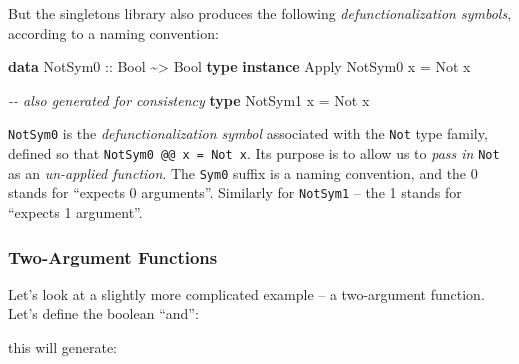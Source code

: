 \documentclass[]{article}
\newenvironment{Shaded}{}{}
\newcommand{\CommentTok}[1]{\textcolor[rgb]{0.38,0.63,0.69}{\textit{#1}}}
\newcommand{\DataTypeTok}[1]{\textcolor[rgb]{0.56,0.13,0.00}{#1}}
\newcommand{\KeywordTok}[1]{\textcolor[rgb]{0.00,0.44,0.13}{\textbf{#1}}}
\newcommand{\NormalTok}[1]{#1}
\newcommand{\OperatorTok}[1]{\textcolor[rgb]{0.40,0.40,0.40}{#1}}
\newcommand{\OtherTok}[1]{\textcolor[rgb]{0.00,0.44,0.13}{#1}}
\begin{document}
But the singletons library also produces the following \emph{defunctionalization
symbols}, according to a naming convention:

\begin{Shaded}
\begin{Highlighting}[]
\KeywordTok{data} \DataTypeTok{NotSym0}\OtherTok{ ::} \DataTypeTok{Bool} \OperatorTok{\textasciitilde{}\textgreater{}} \DataTypeTok{Bool}
\KeywordTok{type} \KeywordTok{instance} \DataTypeTok{Apply} \DataTypeTok{NotSym0}\NormalTok{ x }\OtherTok{=} \DataTypeTok{Not}\NormalTok{ x}

\CommentTok{{-}{-} also generated for consistency}
\KeywordTok{type} \DataTypeTok{NotSym1}\NormalTok{ x }\OtherTok{=} \DataTypeTok{Not}\NormalTok{ x}
\end{Highlighting}
\end{Shaded}

\texttt{NotSym0} is the \emph{defunctionalization symbol} associated with the
\texttt{Not} type family, defined so that \texttt{NotSym0\ @@\ x\ =\ Not\ x}.
Its purpose is to allow us to \emph{pass in} \texttt{Not} as an \emph{un-applied
function}. The \texttt{Sym0} suffix is a naming convention, and the 0 stands for
``expects 0 arguments''. Similarly for \texttt{NotSym1} -- the 1 stands for
``expects 1 argument''.

\subsubsection{Two-Argument Functions}\label{two-argument-functions}

Let's look at a slightly more complicated example -- a two-argument function.
Let's define the boolean ``and'':

\begin{Shaded}
\end{Shaded}

this will generate:
\end{document}
